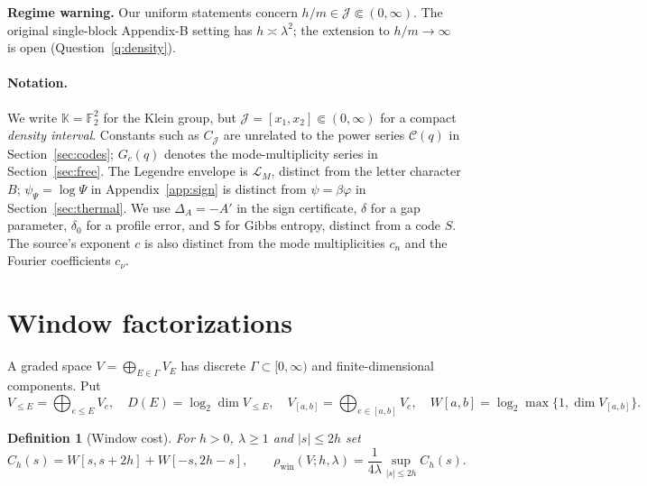 \documentclass[10pt,a4paper]{article}
\numberwithin{equation}{section}
\newtheorem{definition}[theorem]{Definition}
\theoremstyle{remark}\newtheorem{remark}[theorem]{Remark}\newtheorem{question}[theorem]{Question}
\newcommand{\rhow}{\rho_{\mathrm{win}}}\newcommand{\F}{\mathbb F}\newcommand{\K}{\mathbb K}\newcommand{\Z}{\mathbb Z}\newcommand{\R}{\mathbb R}\newcommand{\cB}{\mathcal L}\newcommand{\wt}{\mathrm{wt}}\newcommand{\dimn}{\operatorname{dim}}\newcommand{\supp}{\operatorname{supp}}
\begin{document}
\textbf{Regime warning.} Our uniform statements concern $h/m\in \mathcal J\Subset(0,\infty)$. The original single-block Appendix-B setting has $h\asymp\lambda^2$; the extension to $h/m\to\infty$ is open (Question~\ref{q:density}).

\paragraph{Notation.} We write $\K=\F_2^2$ for the Klein group, but $\mathcal J=[x_1,x_2]\Subset(0,\infty)$ for a compact \emph{density interval}. Constants such as $C_{\mathcal J}$ are unrelated to the power series $\mathcal C(q)$ in Section~\ref{sec:codes}; $G_c(q)$ denotes the mode-multiplicity series in Section~\ref{sec:free}. The Legendre envelope is $\cB_M$, distinct from the letter character $B$; $\psi_{\Psi}=\log\Psi$ in Appendix~\ref{app:sign} is distinct from $\psi=\beta\varphi$ in Section~\ref{sec:thermal}. We use $\Delta_A=-A'$ in the sign certificate, $\delta$ for a gap parameter, $\delta_0$ for a profile error, and $\mathsf S$ for Gibbs entropy, distinct from a code $S$. The source's exponent $c$ is also distinct from the mode multiplicities $c_n$ and the Fourier coefficients $c_\nu$.

\section{Window factorizations}\label{sec:windows}
A graded space $V=\bigoplus_{E\in\Gamma}V_E$ has discrete $\Gamma\subset[0,\infty)$ and finite-dimensional components. Put
\[
V_{\le E}=\bigoplus_{e\le E}V_e,\quad D(E)=\log_2\dimn V_{\le E},\quad
V_{[a,b]}=\bigoplus_{e\in[a,b]}V_e,\quad W[a,b]=\log_2\max\{1,\dimn V_{[a,b]}\}.
\]
\begin{definition}[Window cost]\label{def:windows}
For $h>0$, $\lambda\ge1$ and $|s|\le2h$ set
\[
C_h(s)=W[s,s+2h]+W[-s,2h-s],\qquad
\rhow(V;h,\lambda)=\frac1{4\lambda}\sup_{|s|\le2h}C_h(s).
\]
\end{definition}
\end{document}
